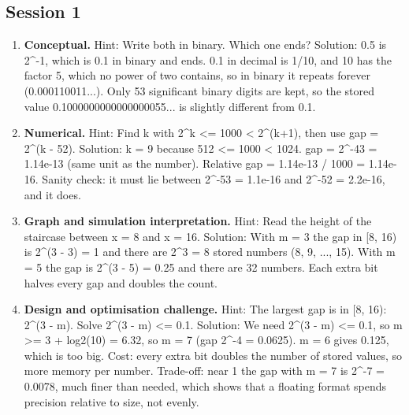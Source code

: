 \documentclass[11pt,a4paper]{article}
\begin{document}
\subsection*{Session 1}
\begin{enumerate}[nosep]
\item \textbf{Conceptual.} Hint: Write both in binary. Which one ends? Solution: 0.5 is 2\textasciicircum{}-1, which is 0.1 in binary and ends. 0.1 in decimal is 1/10, and 10 has the factor 5, which no power of two contains, so in binary it repeats forever (0.000110011...). Only 53 significant binary digits are kept, so the stored value 0.1000000000000000055... is slightly different from 0.1.
\item \textbf{Numerical.} Hint: Find k with 2\textasciicircum{}k \textless{}= 1000 \textless{} 2\textasciicircum{}(k+1), then use gap = 2\textasciicircum{}(k - 52). Solution: k = 9 because 512 \textless{}= 1000 \textless{} 1024. gap = 2\textasciicircum{}-43 = 1.14e-13 (same unit as the number). Relative gap = 1.14e-13 / 1000 = 1.14e-16. Sanity check: it must lie between 2\textasciicircum{}-53 = 1.1e-16 and 2\textasciicircum{}-52 = 2.2e-16, and it does.
\item \textbf{Graph and simulation interpretation.} Hint: Read the height of the staircase between x = 8 and x = 16. Solution: With m = 3 the gap in [8, 16) is 2\textasciicircum{}(3 - 3) = 1 and there are 2\textasciicircum{}3 = 8 stored numbers (8, 9, ..., 15). With m = 5 the gap is 2\textasciicircum{}(3 - 5) = 0.25 and there are 32 numbers. Each extra bit halves every gap and doubles the count.
\item \textbf{Design and optimisation challenge.} Hint: The largest gap is in [8, 16): 2\textasciicircum{}(3 - m). Solve 2\textasciicircum{}(3 - m) \textless{}= 0.1. Solution: We need 2\textasciicircum{}(3 - m) \textless{}= 0.1, so m \textgreater{}= 3 + log2(10) = 6.32, so m = 7 (gap 2\textasciicircum{}-4 = 0.0625). m = 6 gives 0.125, which is too big. Cost: every extra bit doubles the number of stored values, so more memory per number. Trade-off: near 1 the gap with m = 7 is 2\textasciicircum{}-7 = 0.0078, much finer than needed, which shows that a floating format spends precision relative to size, not evenly.
\end{enumerate}
\end{document}
